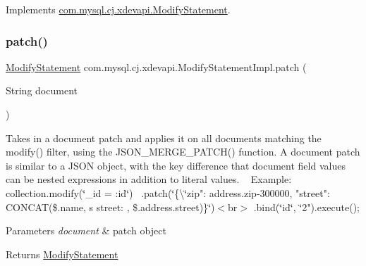 Implements \mbox{\hyperlink{interfacecom_1_1mysql_1_1cj_1_1xdevapi_1_1_modify_statement_adb4e6de8bc815f50dc9ee5241454786c}{com.\+mysql.\+cj.\+xdevapi.\+Modify\+Statement}}.

\mbox{\label{classcom_1_1mysql_1_1cj_1_1xdevapi_1_1_modify_statement_impl_a67bbbca2a519b79e54c1957e4d2f7c92}} 
\subsubsection{\texorpdfstring{patch()}{patch()}\hspace{0.1cm}{\footnotesize\ttfamily [2/2]}}
{\footnotesize\ttfamily \mbox{\hyperlink{interfacecom_1_1mysql_1_1cj_1_1xdevapi_1_1_modify_statement}{Modify\+Statement}} com.\+mysql.\+cj.\+xdevapi.\+Modify\+Statement\+Impl.\+patch (\begin{DoxyParamCaption}\item[{String}]{document }\end{DoxyParamCaption})}

Takes in a document patch and applies it on all documents matching the modify() filter, using the J\+S\+O\+N\+\_\+\+M\+E\+R\+G\+E\+\_\+\+P\+A\+T\+C\+H() function. A document patch is similar to a J\+S\+ON object, with the key difference that document field values can be nested expressions in addition to literal values. ~\newline
 Example\+:~\newline
 collection.\+modify(\char`\"{}\+\_\+id = \+:id\char`\"{})~\newline
 .patch(\char`\"{}\{\textbackslash{}\char`\"{}zip"\+: address.\+zip-\/300000, "street"\+: C\+O\+N\+C\+AT(\$.name, \textquotesingle{}\textquotesingle{}\textquotesingle{}s street\+: \textquotesingle{}, \$.address.\+street)\}\char`\"{})$<$br$>$
.\+bind(\char`\"{}id\char`\"{}, \char`\"{}2").execute();


\begin{DoxyParams}{Parameters}
{\em document} & patch object \\
\hline
\end{DoxyParams}
\begin{DoxyReturn}{Returns}
\mbox{\hyperlink{interfacecom_1_1mysql_1_1cj_1_1xdevapi_1_1_modify_statement}{Modify\+Statement}} 
\end{DoxyReturn}


